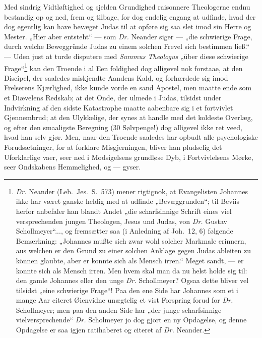\documentclass[12pt,a4paper]{book}
\begin{document}
Med sindrig Vidtløftighed og sjelden Grundighed raisonnere Theologerne endnu bestandig op og
ned, frem og tilbage, for dog endelig engang at udfinde, hvad der dog egentlig kan have
bevæget Judas til at opføre sig saa slet imod sin Herre og Mester. „Hier aber entsteht“ ---
som \textit{Dr.} Neander siger --- „die schwierige Frage, durch welche Beweggründe Judas zu
einem solchen Frevel sich bestimmen ließ.“ --- Uden just at turde disputere med
\textit{Summus Theologus} „über diese schwierige
Frage“\footnote{\textit{Dr.} Neander (Leb.\ Jes.\ S.\ 573) mener rigtignok, at Evangelisten
Johannes ikke har været ganske heldig med at udfinde „Bevæggrunden“; til Beviis herfor
anbefaler han blandt Andet „die scharfsinnige Schrift eines viel versprechenden jungen
Theologen, Jesus und Judas, von \textit{Dr.} Gustav Schollmeyer“..., og fremsætter saa (i
Anledning af Joh.\ 12, 6) følgende Bemærkning: „Johannes mußte sich zwar wohl solcher
Markmale erinnern, aus welchen er den Grund zu einer solchen Anklage gegen Judas ableiten zu
können glaubte, aber er konnte sich als Mensch irren.“ Meget sandt, --- er konnte sich als
Mensch irren. Men hvem skal man da nu helst holde sig til: den gamle Johannes eller den unge
\textit{Dr.} Schollmeyer? Ogsaa dette bliver vel tilsidst „eine schwierige Frage“! Paa den
ene Side har Johannes som et i mange Aar citeret Øienvidne unægtelig et vist Forspring forud
for \textit{Dr.} Schollmeyer; men paa den anden Side har „der junge scharfsinnige
vielversprechende“ \textit{Dr.} Scholmeyer jo dog gjort en ny Opdagelse, og denne Opdagelse
er saa igjen ratihaberet og citeret af \textit{Dr.} Neander.} kan den Troende i al Een\-%
foldighed dog alligevel nok forstaae, at den Discipel, der saaledes miskjendte Aandens Kald,
og forhærdede sig imod Frelserens Kjærlighed, ikke kunde vorde en sand Apostel, men maatte
ende som et Diævelens Redskab; at det Onde, der ulmede i Judas, tilsidst under Indvirkning af
den sidste Katastrophe maatte aabenbare sig i et fortvivlet Gjennembrud; at den Ulykkelige,
der synes at handle med det koldeste Overlæg, og efter den smaaligste Beregning (30
Sølvpenge!) dog alligevel ikke ret veed, hvad han selv gjør. Men, naar den Troende saaledes
har opbudt alle psychologiske Forudsætninger, for at forklare Misgjerningen, bliver han
pludselig det Uforklarlige vaer, seer ned i Modsigelsens grundløse Dyb, i Fortvivlelsens
Mørke, seer Ondskabens Hemmelighed, og --- gyser.
\end{document}
